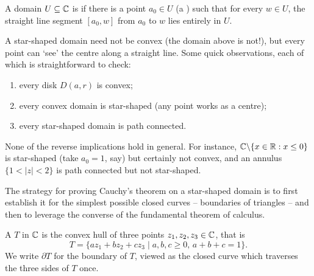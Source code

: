 \documentclass[a4paper]{scrartcl}
\begin{document}
\begin{definition}
    A domain $U \subseteq \mathbb{C}$ is  if there is a point $a_0 \in U$ (a ) such that for every $w \in U$, the straight line segment $[a_0, w]$ from $a_0$ to $w$ lies entirely in $U$.
\end{definition}

\begin{center}
\end{center}

A star-shaped domain need not be convex (the domain above is not!), but every point can `see' the centre along a straight line. Some quick observations, each of which is straightforward to check:
\begin{enumerate}[label=(\roman*)]
    \item every disk $D(a, r)$ is convex;
    \item every convex domain is star-shaped (any point works as a centre);
    \item every star-shaped domain is path connected.
\end{enumerate}
None of the reverse implications hold in general. For instance, $\mathbb{C} \backslash \{x \in \mathbb{R} : x \leq 0\}$ is star-shaped (take $a_0 = 1$, say) but certainly not convex, and an annulus $\{1 < |z| < 2\}$ is path connected but not star-shaped.

The strategy for proving Cauchy's theorem on a star-shaped domain is to first establish it for the simplest possible closed curves -- boundaries of triangles -- and then to leverage the converse of the fundamental theorem of calculus.

\begin{definition}[Triangle]
    A  $T$ in $\mathbb{C}$ is the convex hull of three points $z_1, z_2, z_3 \in \mathbb{C}$, that is
    $$
    T = \{a z_1 + b z_2 + c z_3 \mid a, b, c \geq 0, \, a + b + c = 1\}.
    $$
    We write $\partial T$ for the boundary of $T$, viewed as the closed curve which traverses the three sides of $T$ once.
\end{definition}
\end{document}

